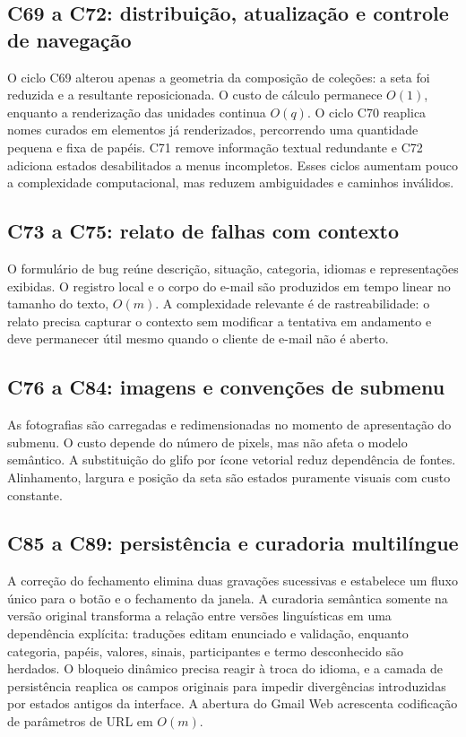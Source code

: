 \documentclass[12pt,a4paper]{article}
\begin{document}
\subsection{C69 a C72: distribuição, atualização e controle de navegação}
O ciclo C69 alterou apenas a geometria da composição de coleções: a seta foi reduzida e a resultante reposicionada. O custo de cálculo permanece $O(1)$, enquanto a renderização das unidades continua $O(q)$. O ciclo C70 reaplica nomes curados em elementos já renderizados, percorrendo uma quantidade pequena e fixa de papéis. C71 remove informação textual redundante e C72 adiciona estados desabilitados a menus incompletos. Esses ciclos aumentam pouco a complexidade computacional, mas reduzem ambiguidades e caminhos inválidos.

\subsection{C73 a C75: relato de falhas com contexto}
O formulário de bug reúne descrição, situação, categoria, idiomas e representações exibidas. O registro local e o corpo do e-mail são produzidos em tempo linear no tamanho do texto, $O(m)$. A complexidade relevante é de rastreabilidade: o relato precisa capturar o contexto sem modificar a tentativa em andamento e deve permanecer útil mesmo quando o cliente de e-mail não é aberto.

\subsection{C76 a C84: imagens e convenções de submenu}
As fotografias são carregadas e redimensionadas no momento de apresentação do submenu. O custo depende do número de pixels, mas não afeta o modelo semântico. A substituição do glifo por ícone vetorial reduz dependência de fontes. Alinhamento, largura e posição da seta são estados puramente visuais com custo constante.

\subsection{C85 a C89: persistência e curadoria multilíngue}
A correção do fechamento elimina duas gravações sucessivas e estabelece um fluxo único para o botão e o fechamento da janela. A curadoria semântica somente na versão original transforma a relação entre versões linguísticas em uma dependência explícita: traduções editam enunciado e validação, enquanto categoria, papéis, valores, sinais, participantes e termo desconhecido são herdados. O bloqueio dinâmico precisa reagir à troca do idioma, e a camada de persistência reaplica os campos originais para impedir divergências introduzidas por estados antigos da interface. A abertura do Gmail Web acrescenta codificação de parâmetros de URL em $O(m)$.
\end{document}

